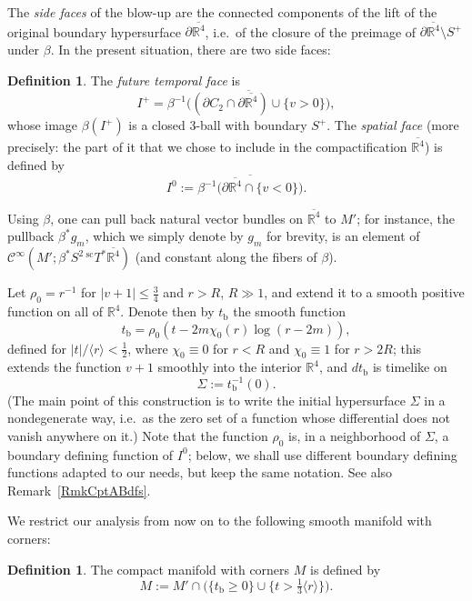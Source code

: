 \documentclass[reqno,11pt,letterpaper]{amsart}
\numberwithin{equation}{section}
\numberwithin{figure}{section}
\theoremstyle{definition}
\newtheorem{definition}[thm]{Definition}
\theoremstyle{remark}
\newcommand{\mc}{\mathcal}
\newcommand{\cC}{\mc C}
\newcommand{\R}{\mathbb{R}}
\newcommand{\la}{\langle}
\newcommand{\ol}{\overline}
\newcommand{\pa}{\partial}
\newcommand{\ra}{\rangle}
\newcommand{\bop}{{\mathrm{b}}}
\newcommand{\scl}{{\mathrm{sc}}}
\newcommand{\Tsc}{{}^{\scl}T}
\newcommand{\half}{\tfrac{1}{2}}
\newcommand{\CI}{\cC^\infty}
\begin{document}
The \emph{side faces} of the blow-up are the connected components of the lift of the original boundary hypersurface $\pa\ol{\R^4}$, i.e.\ of the closure of the preimage of $\pa\ol{\R^4}\setminus S^+$ under $\beta$. In the present situation, there are two side faces:

\begin{definition}
  The \emph{future temporal face} is
  \[
    I^+=\ol{\beta^{-1}\bigl((\pa C_2\cap\pa\ol{\R^4}) \cup \{v>0\}\bigr)},
  \]
whose image $\beta(I^+)$ is a closed $3$-ball with boundary $S^+$. The \emph{spatial face} (more precisely: the part of it that we chose to include in the compactification $\ol{\R^4}$) is defined by
  \[
    I^0 := \ol{\beta^{-1}\bigl(\pa\ol{\R^4}\cap\{v<0\}\bigr)}.
  \]
\end{definition}

Using $\beta$, one can pull back natural vector bundles on $\ol{\R^4}$ to $M'$; for instance, the pullback $\beta^*g_m$, which we simply denote by $g_m$ for brevity, is an element of $\CI(M';\beta^* S^2\,\Tsc^*\ol{\R^4})$ (and constant along the fibers of $\beta$).

Let $\rho_0=r^{-1}$ for $|v+1|\leq\tfrac34$ and $r>R$, $R\gg 1$, and extend it to a smooth positive function on all of $\R^4$. Denote then by $t_\bop$ the smooth function
\begin{equation}
\label{EqCptATimeB}
  t_\bop= \rho_0(t - 2 m \chi_0(r) \log(r-2 m)),
\end{equation}
defined for $|t|/\la r\ra<\half$, where $\chi_0\equiv 0$ for $r<R$ and $\chi_0\equiv 1$ for $r>2 R$; this extends the function $v+1$ smoothly into the interior $\R^4$, and $dt_\bop$ is timelike on
\begin{equation}
\label{EqCptASigma}
  \Sigma:=t_\bop^{-1}(0).
\end{equation}
(The main point of this construction is to write the initial hypersurface $\Sigma$ in a nondegenerate way, i.e.\ as the zero set of a function whose differential does not vanish anywhere on it.) Note that the function $\rho_0$ is, in a neighborhood of $\Sigma$, a boundary defining function of $I^0$; below, we shall use different boundary defining functions adapted to our needs, but keep the same notation. See also Remark~\ref{RmkCptABdfs}.

We restrict our analysis from now on to the following smooth manifold with corners:
\begin{definition}
\label{DefCptAMfd}
  The compact manifold with corners $M$ is defined by
  \[
    M:=M'\cap\bigl(\{t_\bop\geq 0\}\cup\{t>\tfrac13 \la r\ra\}\bigr).
  \]
\end{definition}
\end{document}
